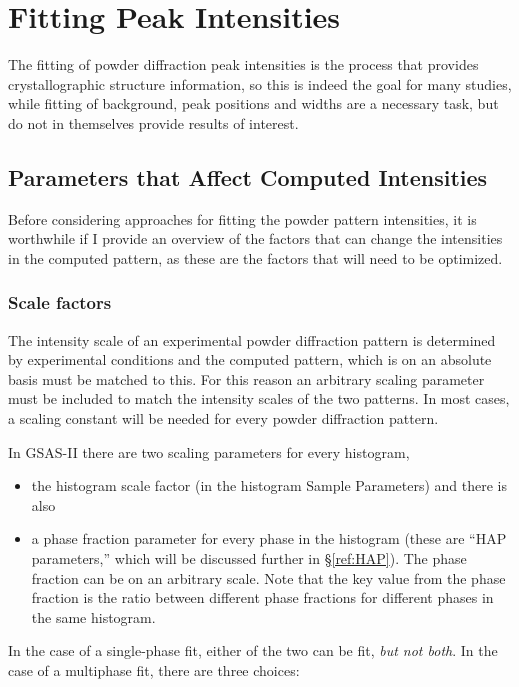 \chapter{Fitting Peak Intensities}
\label{Chap:intensities}

The fitting of powder diffraction peak intensities is the process that provides crystallographic structure information, so this is indeed the goal for many studies, while fitting of background, peak positions and widths are a necessary task, but do not in themselves provide results of interest. 

\section{Parameters that Affect Computed Intensities}
Before considering approaches for fitting the powder pattern intensities, it is worthwhile if I provide an overview of the factors that can change the intensities in the computed pattern, as these are the factors that will need to be optimized. 

\subsection{Scale factors}
The intensity scale of an experimental powder diffraction pattern is determined by experimental conditions and the computed pattern, which is on an absolute basis must be matched to this. For this reason an arbitrary scaling parameter must be included to match the intensity scales of the two patterns. In most cases, a scaling constant will be needed for every powder diffraction pattern. 

In GSAS-II there are two scaling parameters for every histogram,
\begin{itemize}
    \item the histogram scale factor (in the histogram Sample Parameters) and there is also 
    \item a phase fraction parameter for every phase in the histogram (these are ``HAP parameters,'' which will be discussed further in \S\ref{ref:HAP}). The phase fraction can be on an arbitrary scale. Note that the key value from the phase fraction is the ratio between different phase fractions for different phases in the same histogram.
\end{itemize}

\label{ref:scalingfactors1}
In the case of a single-phase fit, either of the two can be fit, \textit{but not both}. 
In the case of a multiphase fit, there are three choices: 

